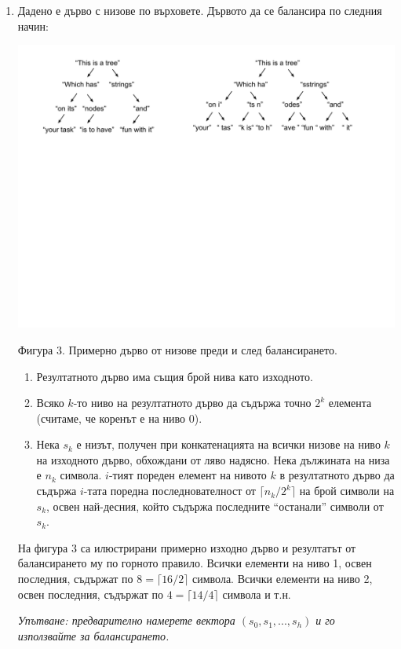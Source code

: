 \documentclass[12pt,a4paper]{article}
\begin{document}
\begin{enumerate}
	\item Дадено е дърво с низове по върховете. Дървото да се балансира по следния начин:

	\begin{flushleft}
	\includegraphics[width=15cm]{images/tree4}

	\vspace{-200px}

	Фигура 3. Примерно дърво от низове преди и след балансирането.
	\end{flushleft}


	\begin{enumerate}
	  \item Резултатното дърво има същия брой нива като изходното.
		\item Всяко $k$-то ниво на резултатното дърво да съдържа точно $2^k$ елемента (считаме, че коренът е на ниво 0).
		\item Нека $s_k$ е низът, получен при конкатенацията на всички низове на ниво $k$ на изходното дърво, обхождани от ляво надясно. Нека дължината на низа е $n_k$ символа. $i$-тият пореден елемент на нивото $k$ в резултатното дърво да съдържа $i$-тата поредна последнователност от $\lceil{n_k/{2^k}}\rceil$ на брой символи на $s_k$, освен най-десния, който съдържа последните ``останали'' символи от $s_k$.
	\end{enumerate}

	На фигура 3 са илюстрирани примерно изходно дърво и резултатът от балансирането му по горното правило. Всички елементи на ниво 1, освен последния, съдържат по $8=\lceil{16/2}\rceil$ символа. Всички елементи на ниво 2, освен последния, съдържат по $4=\lceil{14/4}\rceil$ символа и т.н.


	\emph{Упътване: предварително намерете вектора $(s_0,s_1,...,s_h)$ и го използвайте за балансирането.}

\end{enumerate}
\end{document}
